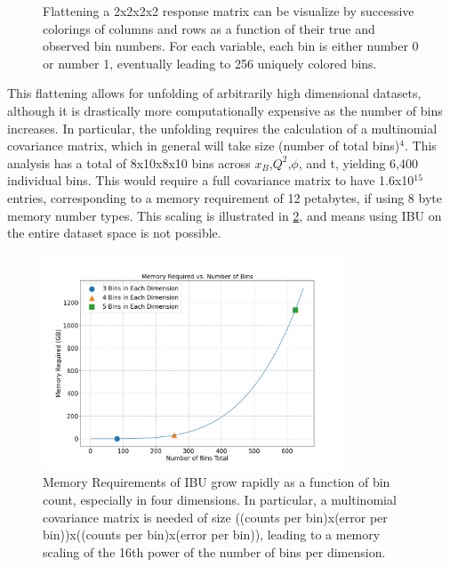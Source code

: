 \begin{figure}[H]
{            \label{fig:response_matrix_xb_q2_phi_t}}
            \caption[Flattening Map on 4D 2 Bin Example]{Flattening a 2x2x2x2 response matrix can be visualize by successive colorings of columns and rows as a function of their true and observed bin numbers. For each variable, each bin is either number 0 or number 1, eventually leading to 256 uniquely colored bins.}
            \label{fig:unrolling}
        \end{figure}
    
        
        


        This flattening allows for unfolding of arbitrarily high dimensional datasets, although it is drastically more computationally expensive as the number of bins increases. In particular, the unfolding requires the calculation of a multinomial covariance matrix, which in general will take size (number of total bins)$^4$. This analysis has a total of 8x10x8x10 bins across $x_B$,$Q^2$,$\phi$, and t, yielding 6,400 individual bins. This would require a full covariance matrix to have 1.6x10$^{15}$ entries, corresponding to a memory requirement of 12 petabytes, if using 8 byte memory number types. This scaling is illustrated in \ref{fig:ibu_mem_scale}, and means using IBU on the entire dataset space is not possible. 

        \begin{figure}[ht]
            \centering
            \includegraphics[trim={0 0 0 0},clip,width=0.8\textwidth]{Chapters/Ch5-Further/0_IBU/pics/memory_required_vs_number_of_bins_in_each_dim.png}
            \caption[Memory Requirements of IBU]{Memory Requirements of IBU grow rapidly as a function of bin count, especially in four dimensions. In particular, a multinomial covariance matrix is needed of size ((counts per bin)x(error per bin))x((counts per bin)x(error per bin)), leading to a memory scaling of the 16th power of the number of bins per dimension.}
            \label{fig:ibu_mem_scale}
        \end{figure}


